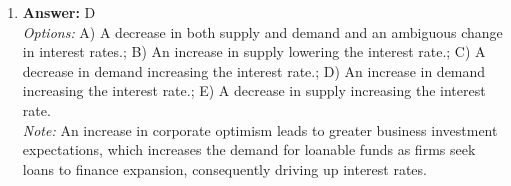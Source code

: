 \documentclass[12pt]{article}
\begin{document}
\begin{enumerate}[label=\arabic*.]
\\ \textit{Options:} A) the anticipated inflation rate plus the nominal interest rate; B) the nominal interest rate multiplied by the inflation rate; C) what one sees when looking at bank literature; D) the anticipated inflation rate minus the nominal interest rate; E) the nominal interest rate minus anticipated inflation
\\ \textit{Note:} The real interest rate represents the purchasing power of money over time, and it is calculated by adjusting the nominal interest rate to account for the erosion of value caused by anticipated inflation.
\item \textbf{Answer:} D
\\ \textit{Options:} A) A decrease in both supply and demand and an ambiguous change in interest rates.; B) An increase in supply lowering the interest rate.; C) A decrease in demand increasing the interest rate.; D) An increase in demand increasing the interest rate.; E) A decrease in supply increasing the interest rate.
\\ \textit{Note:} An increase in corporate optimism leads to greater business investment expectations, which increases the demand for loanable funds as firms seek loans to finance expansion, consequently driving up interest rates.
\end{enumerate}
\end{document}
